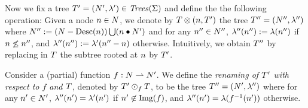 %
%
\hfill
\begin{minipage}{0.55\textwidth}
Now we fix a tree $T'=(N',\lambda')\in{\it Trees}({\Sigma})$ and define the 
the following operation: 
%
Given a node $n\in N$, we denote by $T\otimes(n,T')$ the tree $T''=(N'',
\lambda'')$ where $N'':=(N-\text{Desc}({n}))\bigcup(n\bullet N')$ and for any
$n''\in N''$, $\lambda''(n''):=\lambda(n'')$ if $n\not\le n''$, 
and $\lambda''(n''):=\lambda'(n''-n)$ otherwise.
%
Intuitively, we obtain $T''$ by replacing in $T$ the subtree rooted at $n$ by 
$T'$.
%
\end{minipage}
%

\smallskip
\noindent
Consider a (partial) function $f:N\rightharpoonup N'$.
%
We define the \emph{renaming of $T'$ with respect to $f$ and $T$}, denoted by 
$T'\odot_fT$, to be the tree $T''=(N',\lambda'')$ where for any $n'
\in N'$, $\lambda''(n')=\lambda'(n')$ if $n'\not\in\text{Img}({f})$, and 
$\lambda''(n')=\lambda(f^{-1}(n'))$ otherwise.
%
